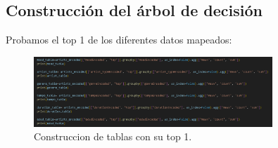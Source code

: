\documentclass[a4paper,12pt]{article}
\begin{document}
\subsection{Construcción del árbol de decisión}
Probamos el top 1 de los diferentes datos mapeados:

\begin{figure}[H]
    \centering
    \includegraphics[width=0.8\textwidth]{19.png}
    \caption{Construccion de tablas con su top 1.}
\end{figure}
\end{document}
